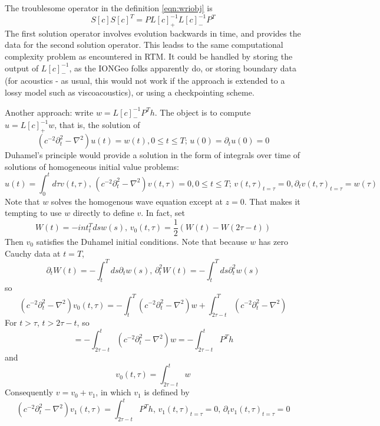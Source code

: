 The troublesome operator in the definition \ref{eqn:wriobj} is 
\[
S[c]S[c]^T = PL[c]^{-1}_+L[c]^{-1}_-P^T
\]
The first solution operator involves evolution backwards in time, and provides the data for the second solution operator. This leadss to the same computational complexity problem as encountered in RTM. It could be handled by storing the output of $L[c]^{-1}_-$, as the IONGeo folks apparently do, or storing boundary data (for acoustics - as usual, this would not work if the approach is extended to a lossy model such as viscoacoustics), or using a checkpointing scheme.

Another approach: write $w = L[c]^{-1}_-P^T h$. The object is to compute $u=L[c]^{-1}_+w$, that is, the solution of 
\[
(c^{-2}\partial_t^2 - \nabla^2)u(t) = w(t), 0\le t \le T; \,u(0) = \partial_t u(0) = 0
\]
Duhamel's principle would provide a solution in the form of integrals over time of solutions of homogeneous initial value problems:
\[
u(t) = \int_0^t d\tau v(t,\tau), \, (c^{-2}\partial_t^2 - \nabla^2)v(t,\tau) = 0, 0\le t \le T; \,v(t,\tau)_{t=\tau} = 0, \partial_t v(t,\tau)_{t=\tau} = w(\tau)
\]
Note that $w$ solves the homogenous wave equation except at $z=0$. That makes it tempting to use $w$ directly to define $v$. In fact, set 
\[
W(t) = -int_t^T ds w(s),\,v_0(t,\tau) = \frac{1}{2}(W(t) - W(2\tau-t)) 
\]
Then $v_0$ satisfies the Duhamel initial conditions. Note that because $w$ has zero Cauchy data at $t=T$,
\[
\partial_t W(t)= -\int_t^T ds \partial_t w(s),\,\partial_t^2 W(t)=-\int_t^T ds \partial^2_t w(s)
\]
so 
\[
(c^{-2}\partial_t^2 - \nabla^2)v_0(t,\tau) = -\int_t^T(c^{-2}\partial^2_t -\nabla^2)w + \int_{2\tau-t}^T(c^{-2}\partial^2_t -\nabla^2)
\]
For $t>\tau$, $t > 2\tau-t$, so 
\[
= -\int_{2\tau-t}^t(c^{-2}\partial^2_t -\nabla^2)w = -\int_{2\tau-t}^t P^Th
\]
and 
\[ 
v_0(t,\tau) = \int_{2\tau-t}^t w  
\] 
Consequently $v=v_0 + v_1$, in which $v_1$ is defined by 
\[
(c^{-2}\partial_t^2 - \nabla^2)v_1(t,\tau) = \int_{2\tau-t}^t P^Th, \,  v_1(t,\tau)_{t=\tau} = 0, \,  \partial_t v_1(t,\tau)_{t=\tau} = 0
\]









